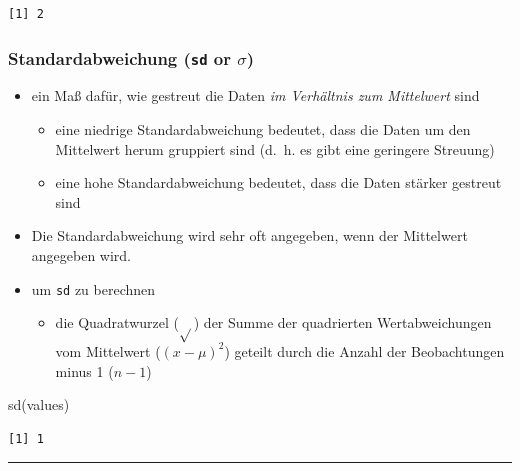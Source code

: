 \documentclass[
  letterpaper,
  DIV=11]{scrartcl}
\newenvironment{Shaded}{\begin{snugshade}}{\end{snugshade}}
\newcommand{\FunctionTok}[1]{\textcolor[rgb]{0.28,0.35,0.67}{#1}}
\newcommand{\NormalTok}[1]{\textcolor[rgb]{0.00,0.23,0.31}{#1}}
\providecommand{\tightlist}{%
  \setlength{\itemsep}{0pt}\setlength{\parskip}{0pt}}\usepackage{longtable,booktabs,array}
\begin{document}
\begin{verbatim}
[1] 2
\end{verbatim}

\hypertarget{standardabweichung-sd-or-sigma}{%
\subsubsection{\texorpdfstring{Standardabweichung (\texttt{sd} or
\(\sigma\))}{Standardabweichung (sd or \textbackslash sigma)}}\label{standardabweichung-sd-or-sigma}}

\begin{itemize}
\item
  ein Maß dafür, wie gestreut die Daten \emph{im Verhältnis zum
  Mittelwert} sind

  \begin{itemize}
  \tightlist
  \item
    eine niedrige Standardabweichung bedeutet, dass die Daten um den
    Mittelwert herum gruppiert sind (d.~h. es gibt eine geringere
    Streuung)
  \item
    eine hohe Standardabweichung bedeutet, dass die Daten stärker
    gestreut sind
  \end{itemize}
\item
  Die Standardabweichung wird sehr oft angegeben, wenn der Mittelwert
  angegeben wird.
\item
  um \texttt{sd} zu berechnen

  \begin{itemize}
  \tightlist
  \item
    die Quadratwurzel (\(\sqrt{}\)) der Summe der quadrierten
    Wertabweichungen vom Mittelwert (\((x - \mu)^2\)) geteilt durch die
    Anzahl der Beobachtungen minus 1 (\(n-1\))
  \end{itemize}
\end{itemize}

\begin{Shaded}
\begin{Highlighting}[]
\FunctionTok{sd}\NormalTok{(values)}
\end{Highlighting}
\end{Shaded}

\begin{verbatim}
[1] 1
\end{verbatim}

\begin{center}\rule{0.5\linewidth}{0.5pt}\end{center}
\end{document}

